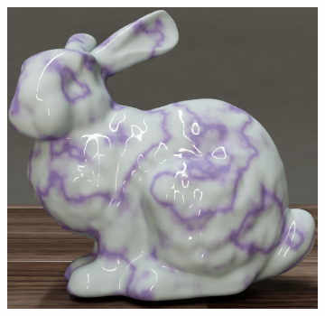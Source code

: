 \begin{figure}[h]
   \centering
   \begin{subfigure}[b]{0.32\textwidth}
       \centering
       \includegraphics[width=\textwidth]{img/ch7/bunny_mrnet.0000.png}
       \caption{}
   \end{subfigure}
   \begin{subfigure}[b]{0.32\textwidth}
       \centering

\end{subfigure}
\end{figure}

